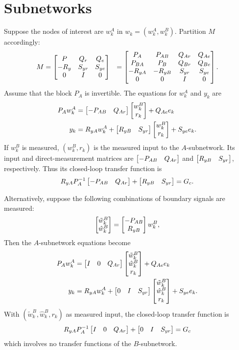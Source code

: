 \documentclass[journal,twoside,web]{ieeecolor}
\begin{document}
\section{Subnetworks}
%
Suppose the nodes of interest are $w_k^A$ in $w_k=(w_k^A,w_k^B)$.
Partition $M$ accordingly:
%
{\setlength{\arraycolsep}{3pt}
$$
\begin{aligned}
M&=\begin{bmatrix} P&Q_r&Q_e\\-R_y&S_{yr}&S_{ye}\\0&I&0\end{bmatrix}
&=\begin{bmatrix} P_A&P_{AB}&Q_{Ar}&Q_{Ae}\\
P_{BA}&P_{B}&Q_{Br}&Q_{Be}\\
-R_{yA}&-R_{yB}&S_{yr}&S_{ye}\\0&0&I&0\end{bmatrix}.
\end{aligned}
$$
}
%
Assume that the block $P_A$ is invertible.
The equations for $w_k^A$ and $y_k$ are
%
\begin{align*}
P_Aw^A_k&=\begin{bmatrix} -P_{AB}&Q_{Ar}\end{bmatrix}\begin{bmatrix} w^B_k\\r_k\end{bmatrix}+Q_{Ae}e_k\\
y_k&=R_{yA}w^A_k+\begin{bmatrix} R_{yB}&S_{yr}\end{bmatrix}\begin{bmatrix} w^B_k\\r_k\end{bmatrix}+S_{ye}e_k.
\end{align*}
%
If $w_k^B$ is measured, $(w_k^B,r_k)$ is the measured input to the
$A$-subnetwork. Its input and direct-measurement matrices are
$\begin{bmatrix}-P_{AB}&Q_{Ar}\end{bmatrix}$ and $\begin{bmatrix} R_{yB}&S_{yr}\end{bmatrix}$,
respectively. Thus its closed-loop transfer function is
%
$$R_{yA} P_A^{-1}\begin{bmatrix}-P_{AB}&Q_{Ar}\end{bmatrix}+\begin{bmatrix} R_{yB}&S_{yr}\end{bmatrix}=G_c.$$

Alternatively, suppose the following combinations of boundary signals
are measured:
%
$$\begin{bmatrix} \tilde w_k^B\\\hat w_k^B\end{bmatrix}=\begin{bmatrix} -P_{AB}\\R_{yB}\end{bmatrix} w^B_k,$$
%
Then the $A$-subnetwork equations become
%
\begin{align*}
P_Aw^A_k&=\begin{bmatrix} I&0& Q_{Ar}\end{bmatrix}\begin{bmatrix} \tilde w^B_k\\\hat w_k^B\\r_k\end{bmatrix}+Q_{Ae}e_k\\
y_k&=R_{yA}w^A_k+\begin{bmatrix} 0&I&S_{yr}\end{bmatrix}\begin{bmatrix} \tilde w^B_k\\\hat w_k^B\\r_k\end{bmatrix}+S_{ye}e_k.
\end{align*}
%
With $(\tilde w_k^B,\hat w_k^B,r_k)$ as measured input, the closed-loop
transfer function is
%
$$R_{yA} P_A^{-1}\begin{bmatrix} I&0&Q_{Ar}\end{bmatrix}+\begin{bmatrix} 0&I&S_{yr}\end{bmatrix}=G_c$$
%
which involves no transfer functions of the $B$-subnetwork.
\end{document}
